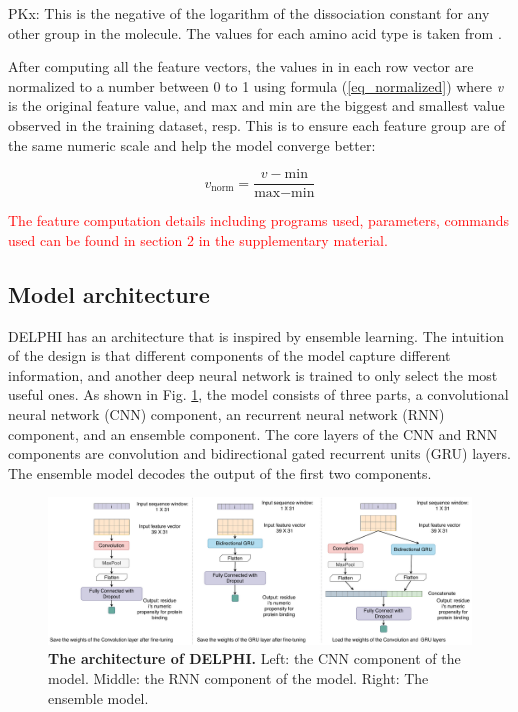 \documentclass{bioinfo}
\newcommand{\myColor}{red}
\begin{document}
\begin{methods}
PKx: This is the negative of the logarithm of the dissociation constant for any other group in the molecule. The values for each amino acid type is taken from \citep{zhang2019sequence}.

After computing all the feature vectors, the values in in each row vector are normalized to a number between 0 to 1 using formula (\ref{eq_normalized}) where \textit{v} is the original feature value, and max and min are the biggest and smallest value observed in the training dataset, resp. This is to ensure each feature group are of the same numeric scale and help the model converge better:

\begin{equation}
v_\text{norm}=\dfrac{v-\text{min}}{\text{max}-\text{min}}\label{eq_normalized}
\end{equation}

\textcolor{\myColor}{The feature computation details including programs used, parameters, commands used can be found in section 2 in the supplementary material.}



\subsection{Model architecture}
DELPHI has an architecture that is inspired by ensemble learning. The intuition of the design is that different components of the model capture different information, and another deep neural network is trained to only select the most useful ones. As shown in Fig. \ref{fig_architecture}, the model consists of three parts, a convolutional neural network (CNN) component, an recurrent neural network (RNN) component, and an ensemble component. The core layers of the CNN and RNN components are convolution and bidirectional gated recurrent units (GRU) layers. The ensemble model decodes the output of the first two components.  
\begin{figure}
\centering
\includegraphics[width=\textwidth]{Model_architecture.pdf}
  \caption{\textbf{The architecture of DELPHI.} Left: the CNN component of the model. Middle: the RNN component of the model. Right: The ensemble model. 
  \label{fig_architecture}}
\end{figure}


\end{methods}
\end{document}
